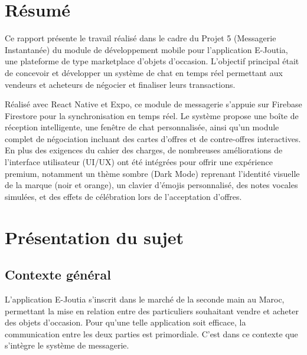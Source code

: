 \documentclass[12pt,a4paper]{report}
\begin{document}
\tableofcontents
\newpage

\chapter*{Résumé}

Ce rapport présente le travail réalisé dans le cadre du Projet 5 (Messagerie Instantanée) du module de développement mobile pour l'application E-Joutia, une plateforme de type marketplace d'objets d'occasion. L'objectif principal était de concevoir et développer un système de chat en temps réel permettant aux vendeurs et acheteurs de négocier et finaliser leurs transactions. 

Réalisé avec React Native et Expo, ce module de messagerie s'appuie sur Firebase Firestore pour la synchronisation en temps réel. Le système propose une boîte de réception intelligente, une fenêtre de chat personnalisée, ainsi qu'un module complet de négociation incluant des cartes d'offres et de contre-offres interactives. En plus des exigences du cahier des charges, de nombreuses améliorations de l'interface utilisateur (UI/UX) ont été intégrées pour offrir une expérience premium, notamment un thème sombre (Dark Mode) reprenant l'identité visuelle de la marque (noir et orange), un clavier d'émojis personnalisé, des notes vocales simulées, et des effets de célébration lors de l'acceptation d'offres.

\newpage

\chapter{Présentation du sujet}

\section{Contexte général}
L'application E-Joutia s'inscrit dans le marché de la seconde main au Maroc, permettant la mise en relation entre des particuliers souhaitant vendre et acheter des objets d'occasion. Pour qu'une telle application soit efficace, la communication entre les deux parties est primordiale. C'est dans ce contexte que s'intègre le système de messagerie.
\end{document}
